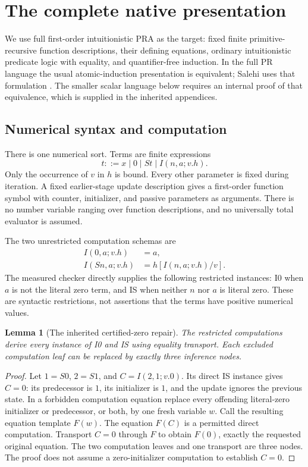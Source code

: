 \documentclass[11pt,letterpaper]{article}
\newtheorem{lemma}[theorem]{Lemma}
\theoremstyle{definition}\newtheorem{definition}[theorem]{Definition}
\theoremstyle{remark}\newtheorem{remark}[theorem]{Remark}
\begin{document}
\section{The complete native presentation}
\label{sec:axioms}

We use full first-order intuitionistic PRA as the target: fixed finite
primitive-recursive function descriptions, their defining equations,
ordinary intuitionistic predicate logic with equality, and quantifier-free
induction. In the full PR language the usual atomic-induction presentation
is equivalent; Salehi uses that formulation \cite{salehi}. The smaller
scalar language below requires an internal proof of that equivalence,
which is supplied in the inherited appendices.

\subsection{Numerical syntax and computation}

There is one numerical sort. Terms are finite expressions
\[
 t ::= x\mid 0\mid St\mid I(n,a;v.h).
\]
Only the occurrence of $v$ in $h$ is bound. Every other parameter is fixed
during iteration. A fixed earlier-stage update description gives a
first-order function symbol with counter, initializer, and passive
parameters as arguments. There is no number variable ranging over
function descriptions, and no universally total evaluator is assumed.

The two unrestricted computation schemas are
\begin{align}
 I(0,a;v.h)&=a,\tag{I0}\label{eq:i0}\\
 I(Sn,a;v.h)&=h[I(n,a;v.h)/v].\tag{IS}\label{eq:is}
\end{align}
The measured checker directly supplies the following restricted instances:
I0 when $a$ is not the literal zero term, and IS when neither $n$ nor $a$
is literal zero. These are syntactic restrictions, not assertions that
the terms have positive numerical values.

\begin{lemma}[The inherited certified-zero repair]
\label{lem:zero-repair}
The restricted computations derive every instance of I0 and IS using
equality transport. Each excluded computation leaf can be replaced by
exactly three inference nodes.
\end{lemma}
\begin{proof}
Let $1=S0$, $2=S1$, and $C=I(2,1;v.0)$. Its direct IS instance gives
$C=0$: its predecessor is $1$, its initializer is $1$, and the update
ignores the previous state. In a forbidden computation equation replace
every offending literal-zero initializer or predecessor, or both, by
one fresh variable $w$. Call the resulting equation template $F(w)$.
The equation $F(C)$ is a permitted direct computation. Transport $C=0$
through $F$ to obtain $F(0)$, exactly the requested original equation.
The two computation leaves and one transport are three nodes. The proof
does not assume a zero-initializer computation to establish $C=0$.
\end{proof}
\end{document}
